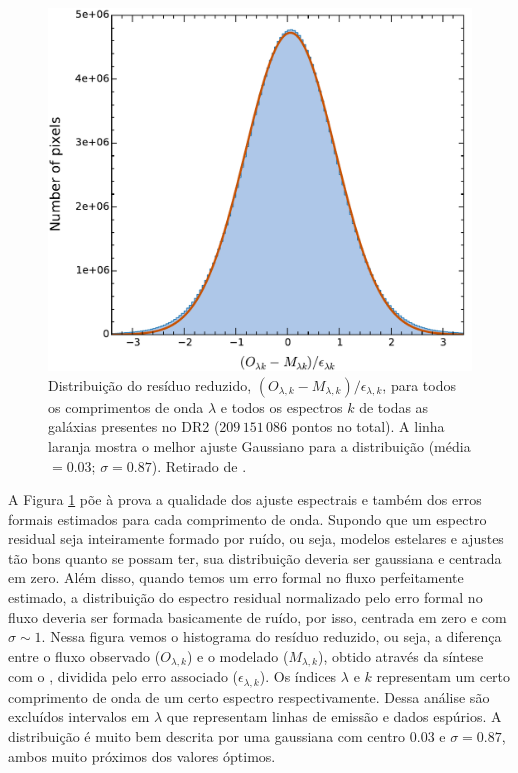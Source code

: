 \begin{figure}
	\centering
	\includegraphics[scale=0.4]{figuras/DR2_hist_error.pdf}
	\caption[DR2: Distribuição dos resíduos reduzidos]
	{Distribuição do resíduo reduzido, $(O_{\lambda,k} - M_{\lambda,k})/\epsilon_{\lambda,k}$, para todos os comprimentos de onda $\lambda$ e todos os espectros $k$ de todas as galáxias presentes no DR2 ($209\,151\,086$ pontos no total). A linha laranja mostra o melhor ajuste Gaussiano para a distribuição (média $= 0.03$; $\sigma = 0.87$). Retirado de \citet{GarciaBenito.etal.2015a}.}
	\label{fig:fres_norm_error_distrib}
\end{figure}

A Figura \ref{fig:fres_norm_error_distrib} põe à prova a qualidade dos ajuste espectrais e também dos erros formais estimados para cada comprimento de onda. Supondo que um espectro residual seja inteiramente formado por ruído, ou seja, modelos estelares e ajustes tão bons quanto se possam ter, sua distribuição deveria ser gaussiana e centrada em zero. Além disso, quando temos um erro formal no fluxo perfeitamente estimado, a distribuição do espectro residual normalizado pelo erro formal no fluxo deveria ser formada basicamente de ruído, por isso, centrada em zero e com $\sigma \sim 1$. Nessa figura vemos o histograma do resíduo reduzido, ou seja, a diferença entre o fluxo observado ($O_{\lambda,k}$) e o modelado ($M_{\lambda,k}$), obtido através da síntese com o \starlight, dividida pelo erro associado ($\epsilon_{\lambda,k}$). Os índices $\lambda$ e $k$ representam um certo comprimento de onda de um certo espectro respectivamente. Dessa análise são excluídos intervalos em $\lambda$ que representam linhas de emissão e dados espúrios. A distribuição é muito bem descrita por uma gaussiana com centro 0.03 e $\sigma = 0.87$, ambos muito próximos dos valores óptimos.

